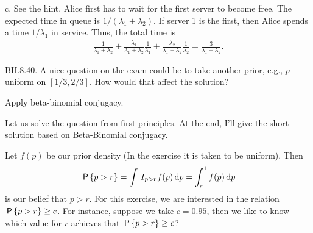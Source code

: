 \begin{exercise}
\begin{solution}
c. See the hint. Alice first has to wait for the first server to become free. The expected time in queue is $1/(\lambda_1+\lambda_2)$. If server 1 is the first, then Alice spends a  time $1/\lambda_1$ in service. Thus, the total time is
\begin{align*}
  \frac{1}{\lambda_1+\lambda_2} +
  \frac{\lambda_1}{\lambda_1+\lambda_2} \frac{1}{\lambda_{1}} +
  \frac{\lambda_2}{\lambda_1+\lambda_2} \frac{1}{\lambda_{2}}  =
\frac{3}{\lambda_1+\lambda_{2}}.
\end{align*}
\end{solution}
\end{exercise}

\begin{exercise}
BH.8.40. A nice question on the exam could be to take another prior, e.g., $p$ uniform on $[1/3, 2/3]$. How would that affect the solution?
\begin{hint}
Apply beta-binomial conjugacy.
\end{hint}
\begin{solution}
Let us solve the question from first principles. At the end, I'll give the short solution based on Beta-Binomial conjugacy.

Let $f(p)$ be our prior density (In the exercise it is taken to be uniform). Then
\begin{align*}
\P{p>r}=\int \1{p>r}f(p) \d p = \int_{r}^{1} f(p) \d p
\end{align*}
is our belief that $p>r$. For this exercise, we are interested in the relation $\P{p>r} \geq c$. For instance, suppose we take $c=0.95$, then we like to know which value for $r$ achieves that $\P{p>r} \geq c$?


\end{solution}
\end{exercise}
